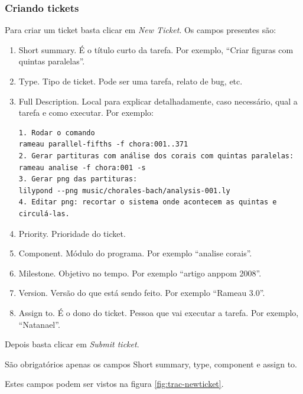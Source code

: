 \documentclass[12pt,brazil]{book}
\newcommand{\eng}[1]{\textit{#1}}
\begin{document}
\subsubsection{Criando tickets}
\label{sec:criando-tickets}

Para criar um ticket basta clicar em \eng{New Ticket}. Os campos
presentes são:

\begin{enumerate}
\item Short summary. É o título curto da tarefa. Por exemplo,
  ``Criar figuras com quintas paralelas''.
\item Type. Tipo de ticket. Pode ser uma tarefa, relato de bug,
  etc.
\item Full Description. Local para explicar detalhadamente, caso
  necessário, qual a tarefa e como executar. Por exemplo:
\begin{verbatim}
1. Rodar o comando
rameau parallel-fifths -f chora:001..371
2. Gerar partituras com análise dos corais com quintas paralelas:
rameau analise -f chora:001 -s
3. Gerar png das partituras:
lilypond --png music/chorales-bach/analysis-001.ly
4. Editar png: recortar o sistema onde acontecem as quintas e circulá-las.
\end{verbatim}
\item Priority. Prioridade do ticket.
\item Component. Módulo do programa. Por exemplo ``analise corais''.
\item Milestone. Objetivo no tempo. Por exemplo ``artigo anppom
  2008''.
\item Version. Versão do que está sendo feito. Por exemplo ``Rameau
  3.0''.
\item Assign to. É o dono do ticket. Pessoa que vai executar a
  tarefa. Por exemplo, ``Natanael''.
\end{enumerate}

Depois basta clicar em \eng{Submit ticket}.

São obrigatórios apenas os campos Short summary, type, component e
assign to.

Estes campos podem ser vistos na figura \ref{fig:trac-newticket}.
\end{document}
